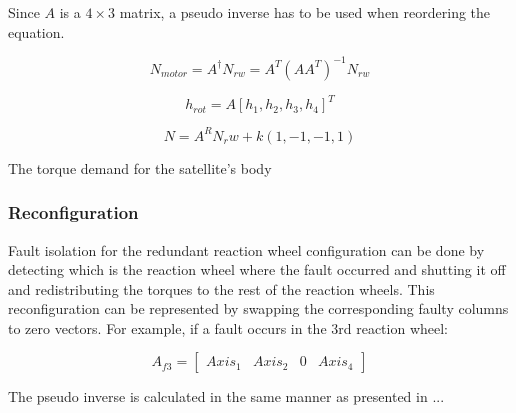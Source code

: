Since $A$ is a $ 4 \times 3 $ matrix, a pseudo inverse has to be used when reordering the equation.

\begin{equation}
N_{motor} = A ^\dagger N_{rw}   =  A^T  (A A ^T)^{-1} N_{rw}
\end{equation}


\cite[equation 18.41-42]{SADC}
\cite{reactionWheelConfigThesis}

\begin{equation}
h_{rot} = A\left[ h_1, h_2, h_3, h_4 \right]^T
\end{equation}

\begin{equation}
N = A^R \textbf{$N_rw$} + k\left(1,-1,-1,1\right)
\end{equation}


The torque demand for the satellite's body

\subsubsection{Reconfiguration}

Fault isolation for the redundant reaction wheel configuration can be done by detecting which is the reaction wheel where the fault occurred and shutting it off and redistributing the torques to the rest of the reaction wheels. This reconfiguration can be represented by swapping the corresponding faulty columns to zero vectors. For example, if a fault occurs in the 3rd reaction wheel:

\begin{equation}
A_{f3} = \begin{bmatrix}
Axis_{1}       & Axis_{2}  & 0  & Axis_{4} 
\end{bmatrix}
\end{equation}

The pseudo inverse is calculated in the same manner as presented in ... 



